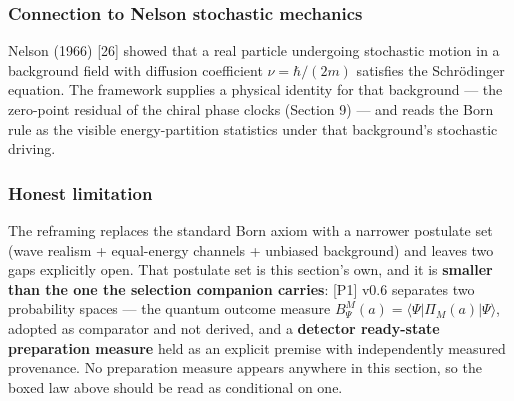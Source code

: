 \documentclass[
]{article}
\begin{document}
\subsubsection{Connection to Nelson stochastic
mechanics}\label{connection-to-nelson-stochastic-mechanics}

Nelson (1966) {[}26{]} showed that a real particle undergoing stochastic
motion in a background field with diffusion coefficient
\(\nu = \hbar/(2m)\) satisfies the Schrödinger equation. The framework
supplies a physical identity for that background --- the zero-point
residual of the chiral phase clocks (Section 9) --- and reads the Born
rule as the visible energy-partition statistics under that background's
stochastic driving.

\subsubsection{Honest limitation}\label{honest-limitation}

The reframing replaces the standard Born axiom with a narrower postulate
set (wave realism + equal-energy channels + unbiased background) and
leaves two gaps explicitly open. That postulate set is this section's
own, and it is \textbf{smaller than the one the selection companion
carries}: {[}P1{]} v0.6 separates two probability spaces --- the quantum
outcome measure \(B^M_\Psi(a) = \langle\Psi|\Pi_M(a)|\Psi\rangle\),
adopted as comparator and not derived, and a \textbf{detector
ready-state preparation measure} held as an explicit premise with
independently measured provenance. No preparation measure appears
anywhere in this section, so the boxed law above should be read as
conditional on one.
\end{document}
